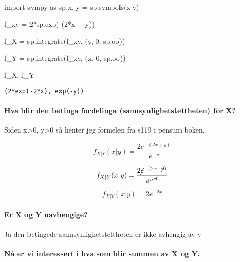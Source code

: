 \documentclass[
  12pt,
  a4paper,
  DIV=11,
  numbers=noendperiod]{scrartcl}
\let\oldparagraph\paragraph
\renewcommand{\paragraph}[1]{\oldparagraph{#1}\mbox{}}
\newenvironment{Shaded}{\begin{snugshade}}{\end{snugshade}}
\newcommand{\DecValTok}[1]{\textcolor[rgb]{0.68,0.00,0.00}{#1}}
\newcommand{\ImportTok}[1]{\textcolor[rgb]{0.00,0.46,0.62}{#1}}
\newcommand{\NormalTok}[1]{\textcolor[rgb]{0.00,0.23,0.31}{#1}}
\newcommand{\OperatorTok}[1]{\textcolor[rgb]{0.37,0.37,0.37}{#1}}
\newcommand{\StringTok}[1]{\textcolor[rgb]{0.13,0.47,0.30}{#1}}
\begin{document}
\begin{Shaded}
\begin{Highlighting}[]
\ImportTok{import}\NormalTok{ sympy }\ImportTok{as}\NormalTok{ sp}
\NormalTok{x, y }\OperatorTok{=}\NormalTok{ sp.symbols(}\StringTok{\textquotesingle{}x y\textquotesingle{}}\NormalTok{)}

\NormalTok{f\_xy }\OperatorTok{=} \DecValTok{2}\OperatorTok{*}\NormalTok{sp.exp(}\OperatorTok{{-}}\NormalTok{(}\DecValTok{2}\OperatorTok{*}\NormalTok{x }\OperatorTok{+}\NormalTok{ y))}

\NormalTok{f\_X }\OperatorTok{=}\NormalTok{ sp.integrate(f\_xy, (y, }\DecValTok{0}\NormalTok{, sp.oo))}


\NormalTok{f\_Y }\OperatorTok{=}\NormalTok{ sp.integrate(f\_xy, (x, }\DecValTok{0}\NormalTok{, sp.oo))}

\NormalTok{f\_X, f\_Y}
\end{Highlighting}
\end{Shaded}

\begin{verbatim}
(2*exp(-2*x), exp(-y))
\end{verbatim}

\paragraph{Hva blir den betinga fordelinga (sannsynlighetstettheten) for
X?}\label{hva-blir-den-betinga-fordelinga-sannsynlighetstettheten-for-x}

Siden x\textgreater0, y\textgreater0 så henter jeg formelen fra s119 i
pensum boken.

\[f_{X|Y}(x|y) = \frac{2e^{-(2x+y)}}{e^{-y}}\]

\begin{equation*}
f_{X|Y}(x|y) = \frac{2\cancel{e}^{-(2x+\cancel{y})}}{\cancel{e^{-y}}}
\end{equation*}

\[f_{X|Y}(x|y) = 2e^{-2x}\]

\paragraph{Er X og Y uavhengige?}\label{er-x-og-y-uavhengige}

Ja den betingede sannsynlighetstettheten er ikke avhengig av y

\paragraph{Nå er vi interessert i hva som blir summen av X og
Y.}\label{nuxe5-er-vi-interessert-i-hva-som-blir-summen-av-x-og-y.}
\end{document}
